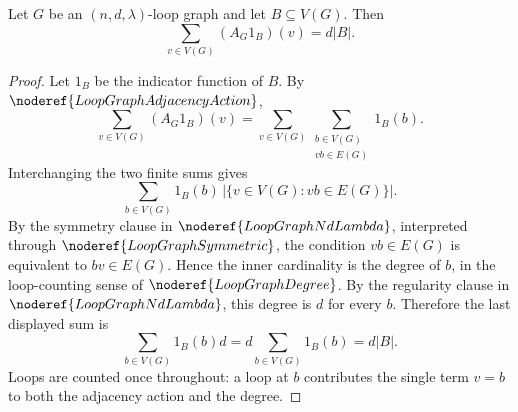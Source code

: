 \begin{helper}
Let \(G\) be an \((n,d,\lambda)\)-loop graph and let \(B\subseteq V(G)\). Then
\[
  \sum_{v\in V(G)} (A_G1_B)(v)=d|B|.
\]
\end{helper}
\begin{proof}
Let \(1_B\) be the indicator function of \(B\). By \(\noderef{LoopGraphAdjacencyAction}\),
\[
  \sum_{v\in V(G)}(A_G1_B)(v)
  =
  \sum_{v\in V(G)}\sum_{\substack{b\in V(G)\\ vb\in E(G)}}1_B(b).
\]
Interchanging the two finite sums gives
\[
  \sum_{b\in V(G)}1_B(b)\,
    |\{v\in V(G):vb\in E(G)\}|.
\]
By the symmetry clause in \(\noderef{LoopGraphNdLambda}\), interpreted through \(\noderef{LoopGraphSymmetric}\), the condition \(vb\in E(G)\) is equivalent to \(bv\in E(G)\). Hence the inner cardinality is the degree of \(b\), in the loop-counting sense of \(\noderef{LoopGraphDegree}\). By the regularity clause in \(\noderef{LoopGraphNdLambda}\), this degree is \(d\) for every \(b\). Therefore the last displayed sum is
\[
  \sum_{b\in V(G)}1_B(b)d=d\sum_{b\in V(G)}1_B(b)=d|B|.
\]
Loops are counted once throughout: a loop at \(b\) contributes the single term \(v=b\) to both the adjacency action and the degree.
\end{proof}
